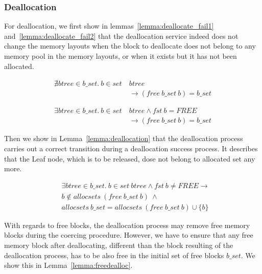 \subsubsection{Deallocation}\label{sec:functionalDealloc}
For deallocation, we first show in lemmas~\ref{lemma:deallocate_fail1} and~\ref{lemma:deallocate_fail2} that the deallocation service indeed does not change the memory layouts when the block to deallocate does not belong to any memory pool in the memory layouts, or when it exists but it has not been allocated.

\begin{lemma} 
\label{lemma:deallocate_fail1}
\begin{align*}
\nexists btree \in b\_set.\ b \in set\ &btree\\
&\longrightarrow (free\ b\_set\ b) = b\_set
\end{align*}
\end{lemma}
	
\begin{lemma} 
\label{lemma:deallocate_fail2}
\begin{align*}
\exists btree \in b\_set.\ b \in set\ &btree \wedge fst\ b = FREE\\
&\longrightarrow (free\ b\_set\ b) = b\_set
\end{align*}
\end{lemma}

Then we show in Lemma~\ref{lemma:deallocation} that the deallocation process carries out a correct transition during a deallocation success process. It describes that the Leaf node, which is to be released, dose not belong to allocated set any more.

\begin{lemma} 
\label{lemma:deallocation}
\end{lemma}
\vspace{-7pt}
\begin{align*}
&\exists btree \in b\_set.\ b \in set\ btree \wedge fst\ b \neq FREE \longrightarrow \\ 
&b\notin allocsets\ (free\ b\_set\ b)\ \wedge \\
&allocsets\ b\_set = allocsets\ (free\ b\_set\ b) \cup \lbrace b \rbrace
\end{align*}
\vspace{-12pt}

With regards to free blocks, the deallocation process may remove free memory blocks during the coercing procedure. However, we have to ensure that any free memory block after deallocating, different than the block resulting of the deallocation process, has to be also free in the initial set of free blocks $b\_set$. We show this in Lemma~\ref{lemma:freedealloc}.

